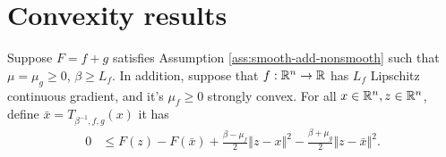 \documentclass[12pt]{report}
\begin{document}
    \section{Convexity results}
        \begin{theorem}\label{thm:cnvx-pg-ineq}
            Suppose $F = f + g$ satisfies Assumption \ref{ass:smooth-add-nonsmooth} such that $\mu = \mu_g \ge 0$, $\beta \ge L_f$. 
            In addition, suppose that $f:\mathbb R^n\rightarrow \mathbb R$ has $L_f$ Lipschitz continuous gradient, and it's $\mu_f \ge 0$ strongly convex. 
            For all $x \in \mathbb R^n, z \in \mathbb R^n$, define $\bar x = T_{\beta^{-1}, f, g}(x)$ it has 
            \begin{align*}
                0 &\le 
                F(z) - F(\bar x) + 
                \frac{\beta - \mu_f}{2}\Vert z - x\Vert^2
                - \frac{\beta + \mu_g}{2}\Vert z - \bar x\Vert^2. 
            \end{align*}
        \end{theorem}
\end{document}
